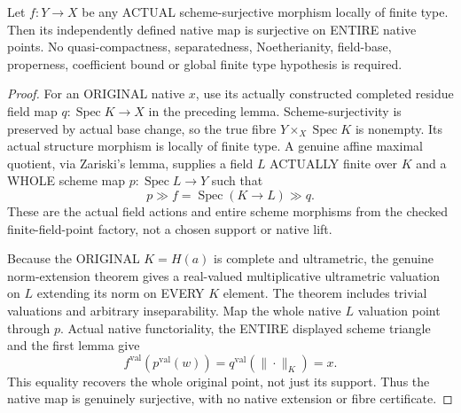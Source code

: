 \begin{theorem}
\label{scheme:native-locally-finite-type-surjective}
Let $f:Y\to X$ be any ACTUAL scheme-surjective morphism locally of finite type.
Then its independently defined native map is surjective on ENTIRE native points.
No quasi-compactness, separatedness, Noetherianity, field-base, properness,
coefficient bound or global finite type hypothesis is required.
\leanok
\end{theorem}
\begin{proof}
For an ORIGINAL native $x$, use its actually constructed completed residue field
map $q:\operatorname{Spec}K\to X$ in the preceding lemma. Scheme-surjectivity
is preserved by actual base change, so the true fibre $Y\times_X\operatorname{Spec}K$
is nonempty. Its actual structure morphism is locally of finite type. A genuine
affine maximal quotient, via Zariski's lemma, supplies a field $L$ ACTUALLY finite
over $K$ and a WHOLE scheme map $p:\operatorname{Spec}L\to Y$ such that
\[
 p\mathbin{\gg} f=\operatorname{Spec}(K\to L)\mathbin{\gg}q.
\]
These are the actual field actions and entire scheme morphisms from the checked
finite-field-point factory, not a chosen support or native lift.

Because the ORIGINAL $K=H(a)$ is complete and ultrametric, the genuine norm-extension
theorem gives a real-valued multiplicative ultrametric valuation on $L$ extending
its norm on EVERY $K$ element. The theorem includes trivial valuations and arbitrary
inseparability. Map the whole native $L$ valuation point through $p$. Actual native
functoriality, the ENTIRE displayed scheme triangle and the first lemma give
\[
 f^{\mathrm{val}}(p^{\mathrm{val}}(w))=q^{\mathrm{val}}(\|\cdot\|_K)=x.
\]
This equality recovers the whole original point, not just its support. Thus the
native map is genuinely surjective, with no native extension or fibre certificate.
\end{proof}

